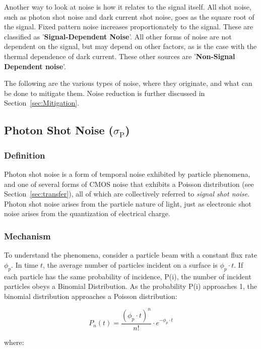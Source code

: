 \documentclass[10pt]{article}
\begin{document}
Another way to look at noise is how it relates to the signal itself. All shot noise, such as photon shot noise and dark current shot noise, goes as the square root of the signal. Fixed pattern noise increases proportionately to the signal. These are classified as '\textbf{Signal-Dependent Noise}'. All other forms of noise are not dependent on the signal, but may depend on other factors, as is the case with the thermal dependence of dark current. These other sources are '\textbf{Non-Signal Dependent noise}'. 

The following are the various types of noise, where they originate, and what can be done to mitigate them. Noise reduction is further discussed in Section~\ref{sec:Mitigation}.

\subsection{Photon Shot Noise (\boldmath $\sigma_{\text{P}}$)}
\label{sec:psn}

\subsubsection{Definition}

Photon shot noise is a form of temporal noise exhibited by particle phenomena, and one of several forms of CMOS noise that exhibits a Poisson distribution (see Section~\ref{sec:transfer}), all of which are collectively referred to \emph{signal shot noise}. Photon shot noise arises from the particle nature of light, just as electronic shot noise arises from the quantization of electrical charge.  

\subsubsection{Mechanism}

To understand the phenomena, consider a particle beam with a constant flux rate $\phi_p$. In time $t$, the average number of particles incident on a surface is $\phi_p \cdot t$. If each particle has the same probability of incidence, P(i), the number of incident particles obeys a Binomial Distribution. As the probability P(i) approaches 1, the binomial distribution approaches a Poisson distribution:

$$P_n(t)=\frac{(\phi_p \cdot t)^n}{n!} \cdot e^{-\phi_p \cdot t}$$

\vspace{-2mm}

\noindent where:
\end{document}
